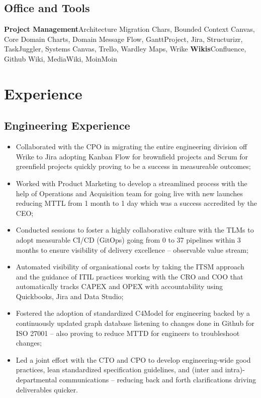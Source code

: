 \documentclass[11pt,a4paper,nolmodern,colorlinks=true,linkcolor=true]{moderncv}
\begin{document}
\subsection{Office and Tools}
           {\textbf{Project Management}}{Architecture Migration Chars, Bounded Context Canvas, Core Domain Charts, Domain Message Flow, GanttProject, Jira, Structurizr, TaskJuggler, Systems Canvas, Trello, Wardley Maps, Wrike}
           {\textbf{Wikis}}{Confluence, Github Wiki, MediaWiki, MoinMoin}

\newpage

\section{Experience}
\subsection{Engineering Experience}


%
  {
    \begin{itemize}
      \item Collaborated with the CPO in migrating the entire engineering division off Wrike to Jira adopting Kanban Flow for brownfield projects and Scrum for greenfield projects quickly proving to be a success in measureable outcomes;
      \item Worked with Product Marketing to develop a streamlined process with the help of Operations and Acquisition team for going live with new launches reducing MTTL from 1 month to 1 day which was a success accredited by the CEO;
      \item Conducted sessions to foster a highly collaborative culture with the TLMs to adopt measurable CI/CD (GitOps) going from 0 to 37 pipelines within 3 months to ensure visibility of delivery excellence -- observable value stream;
      \item Automated visibility of organisational costs by taking the ITSM approach and the guidance of ITIL practices working with the CRO and COO that automatically tracks CAPEX and OPEX with accountability using Quickbooks, Jira and Data Studio;
      \item Fostered the adoption of standardized C4Model for engineering backed by a continuously updated graph database listening to changes done in Github for ISO 27001 -- also proving to reduce MTTD for engineers to troubleshoot changes;
      \item Led a joint effort with the CTO and CPO to develop engineering-wide good practices, lean standardized specification guidelines, and (inter and intra)-departmental communications -- reducing back and forth clarifications driving deliverables quicker.
    \end{itemize}
}
\end{document}
